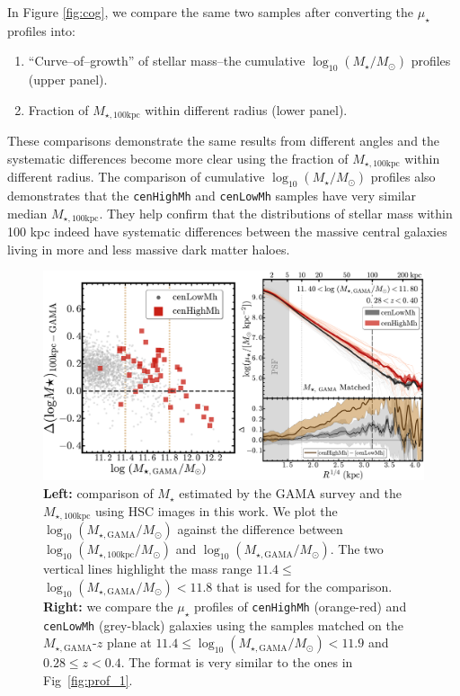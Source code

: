 \documentclass[a4paper,fleqn,usenatbib]{mnras}
\def\rbcg{\texttt{cenHighMh}}
\def\nbcg{\texttt{cenLowMh}}
\def\mstar{{$M_{\star}$}}
\def\logms{{$\log_{10} (M_{\star}/M_{\odot})$}}
\def\mtot{{$M_{\star,100\mathrm{kpc}}$}}
\def\mgama{{$M_{\star,\mathrm{GAMA}}$}}
\def\logmtot{{$\log_{10} (M_{\star,100\mathrm{kpc}}/M_{\odot})$}}
\def\logmgama{{$\log_{10} (M_{\star,\mathrm{GAMA}}/M_{\odot})$}}
\def\mden{{$\mu_{\star}$}}
\begin{document}
	In Figure \ref{fig:cog}, we compare the same two samples after converting the 
	\mden{} profiles into: 
	
	\begin{enumerate}
	
	    \item ``Curve--of--growth'' of stellar mass--the cumulative \logms{} profiles
	        (upper panel).
	    
	    \item Fraction of \mtot{} within different radius (lower panel).
	
	\end{enumerate}
	
	These comparisons demonstrate the same results from different angles and 
	the systematic differences become more clear using the fraction of \mtot{}
	within different radius.  
	The comparison of cumulative \logms{} profiles also demonstrates that the 
	\rbcg{} and \nbcg{} samples have very similar median \mtot{}.  
    They help confirm that the distributions of stellar mass within 100 kpc indeed 
    have systematic differences between the massive central galaxies living in more 
    and less massive dark matter haloes. 


\begin{figure}
    \centering
    \includegraphics[width=16cm]{fig/redbcg_prof_gama_new}
    \caption{
        \textbf{Left:} comparison of \mstar{} estimated by the GAMA survey and 
        the \mtot{} using HSC images in this work. 
        We plot the \logmgama{} against the difference between \logmtot{} and \logmgama{}. 
        The two vertical lines highlight the mass range $11.4 \leq$\logmgama{}$<11.8$ 
        that is used for the comparison.~~
        \textbf{Right:} we compare the \mden{} profiles of \rbcg{} (orange-red) and 
        \nbcg{} (grey-black) galaxies using the samples matched on the 
        \mgama{}-$z$ plane at $11.4 \leq$\logmgama{}$<11.9$ and $0.28 \leq z < 0.4$. 
        The format is very similar to the ones in Fig~\ref{fig:prof_1}.}
    \label{fig:gama}
\end{figure}
\end{document}
